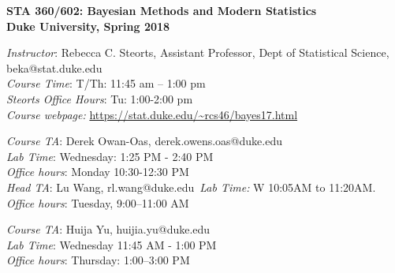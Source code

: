 \documentclass[11pt]{article}
\date{}
\begin{document}

\begin{center}
{\Large\bf STA 360/602: Bayesian Methods and Modern Statistics} \\

{\Large\bf Duke University, Spring 2018} \\
\end{center}

\emph{Instructor}: Rebecca C. Steorts,  Assistant Professor, Dept of Statistical Science, beka@stat.duke.edu\\
\emph{Course Time}: T/Th: 11:45 am -- 1:00 pm\\
\emph{Steorts Office Hours}: Tu: 1:00-2:00 pm \\
\emph{Course webpage:} \url{https://stat.duke.edu/~rcs46/bayes17.html} \\
\vspace*{1em}

\emph{Course TA}: Derek Owan-Oas, derek.owens.oas@duke.edu \\
\emph{Lab Time}: Wednesday: 1:25 PM - 2:40 PM \\
\emph{Office hours}: Monday 10:30-12:30 PM \\

\emph{Head TA}:  Lu Wang, rl.wang@duke.edu\
\emph{Lab Time:} W 10:05AM to 11:20AM.\\
\emph{Office hours}: Tuesday, 9:00--11:00 AM\\
\vspace*{1em}

\emph{Course TA}: Huija Yu, huijia.yu@duke.edu \\
\emph{Lab Time}: Wednesday 11:45 AM - 1:00 PM\\
\emph{Office hours}: Thursday: 1:00--3:00 PM  \\


\end{document}
